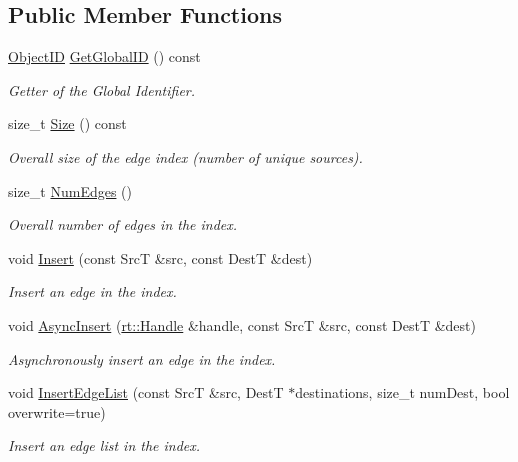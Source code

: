 \subsection*{Public Member Functions}
\begin{DoxyCompactItemize}
\item 
\hyperlink{classshad_1_1EdgeIndex_ac1849d1d8dc7f32e2ca56fa224308ef2}{Object\-I\-D} \hyperlink{classshad_1_1EdgeIndex_aa07ea25da27d521c32434d0dc3dc5ac9}{Get\-Global\-I\-D} () const 
\begin{DoxyCompactList}\small\item\em Getter of the Global Identifier. \end{DoxyCompactList}\item 
size\-\_\-t \hyperlink{classshad_1_1EdgeIndex_a2e4c3f4a29d28742879d3119d835fc57}{Size} () const 
\begin{DoxyCompactList}\small\item\em Overall size of the edge index (number of unique sources). \end{DoxyCompactList}\item 
size\-\_\-t \hyperlink{classshad_1_1EdgeIndex_ac2177910ddf94f52f4b1833a72509992}{Num\-Edges} ()
\begin{DoxyCompactList}\small\item\em Overall number of edges in the index. \end{DoxyCompactList}\item 
void \hyperlink{classshad_1_1EdgeIndex_a410c822912b1335afaa8c393ebeb5c2c}{Insert} (const Src\-T \&src, const Dest\-T \&dest)
\begin{DoxyCompactList}\small\item\em Insert an edge in the index. \end{DoxyCompactList}\item 
void \hyperlink{classshad_1_1EdgeIndex_a28391328c8882398f6452f7987ecbe53}{Async\-Insert} (\hyperlink{classshad_1_1rt_1_1Handle}{rt\-::\-Handle} \&handle, const Src\-T \&src, const Dest\-T \&dest)
\begin{DoxyCompactList}\small\item\em Asynchronously insert an edge in the index. \end{DoxyCompactList}\item 
void \hyperlink{classshad_1_1EdgeIndex_a3d46667ec205db01b0fd6e9d418cf192}{Insert\-Edge\-List} (const Src\-T \&src, Dest\-T $\ast$destinations, size\-\_\-t num\-Dest, bool overwrite=true)
\begin{DoxyCompactList}\small\item\em Insert an edge list in the index. \end{DoxyCompactList}\item 

\end{DoxyCompactItemize}
